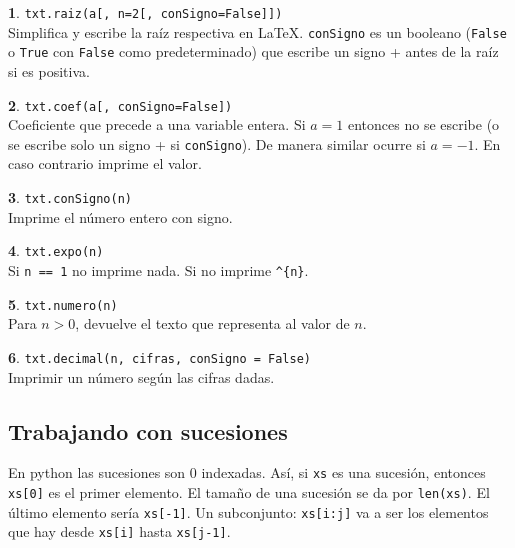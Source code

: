 \documentclass[12pt]{article}
\theoremstyle{definition}
\newtheorem{funcion}{}[section]
\begin{document}
\begin{funcion}
  \verb|txt.raiz(a[, n=2[, conSigno=False]])| \\[1ex]
  Simplifica y escribe la raíz respectiva en \LaTeX. \verb|conSigno| es un booleano (\verb|False| o \verb|True| con \verb|False| como predeterminado) que escribe un signo + antes de la raíz si es positiva.
\end{funcion}

\begin{funcion}
  \verb|txt.coef(a[, conSigno=False])| \\[1ex]
  Coeficiente que precede a una variable entera. Si $a=1$ entonces no se escribe (o se escribe solo un signo + si \verb|conSigno|). De manera similar ocurre si $a=-1$. En caso contrario imprime el valor.
\end{funcion}

\begin{funcion}
  \verb|txt.conSigno(n)| \\[1ex]
  Imprime el número entero con signo.
\end{funcion}

\begin{funcion}
  \verb|txt.expo(n)| \\[1ex]
  Si \verb|n == 1| no imprime nada. Si no imprime \verb|^{n}|.
\end{funcion}

\begin{funcion}
  \verb|txt.numero(n)| \\[1ex]
  Para $n > 0$, devuelve el texto que representa al valor de $n$.
\end{funcion}

\begin{funcion}
  \verb|txt.decimal(n, cifras, conSigno = False)| \\[1ex]
  Imprimir un número según las cifras dadas.
\end{funcion}

\subsection{Trabajando con sucesiones}

En python las sucesiones son 0 indexadas. Así, si \verb|xs| es una sucesión, entonces \verb|xs[0]| es el primer elemento. El tamaño de una sucesión se da por \verb|len(xs)|. El último elemento sería \verb|xs[-1]|. Un subconjunto: \verb|xs[i:j]| va a ser los elementos que hay desde \verb|xs[i]| hasta \verb|xs[j-1]|.
\end{document}
